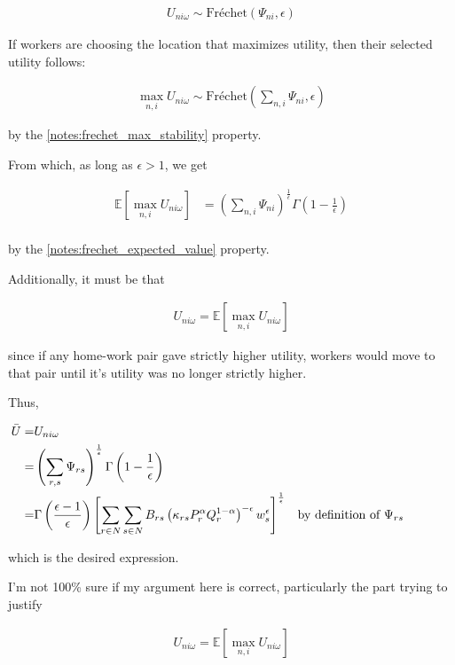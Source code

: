 \documentclass[10pt]{article}
\begin{document}
\begin{align}
    U_{n i \omega} \sim \text{Fréchet}\left(\Psi_{n i}, \epsilon\right)
\end{align}

If workers are choosing the location that maximizes utility, 
then their selected utility follows:

\begin{align}
    \max_{n, i} U_{n i \omega} \sim \text{Fréchet}\left(\sum_{n, i} \Psi_{n i}, \epsilon\right)
\end{align}

by the \autoref{notes:frechet_max_stability} property.

From which, as long as $\epsilon > 1$, we get

\begin{align}
    \mathbb{E}[ \max_{n, i} U_{n i \omega}] &= \left(\sum_{n, i} \Psi_{n i}\right)^{\frac{1}{\epsilon}} \Gamma\left(1-\frac{1}{\epsilon}\right) \\
\end{align}

by the \autoref{notes:frechet_expected_value} property.

Additionally, it must be that

\begin{align}
    U_{n i \omega}= \mathbb{E}[ \max_{n, i} U_{n i \omega}]
\end{align}

since if any home-work pair gave strictly higher 
utility, workers would move to that pair until 
it's utility was no longer strictly higher.

Thus, 

\begin{align}
    \bar{U} =  &U_{n i \omega}  \\ 
    = &\left(\sum_{r, s} \Psi_{r s}\right)^{\frac{1}{\epsilon}} \Gamma\left(1-\frac{1}{\epsilon}\right) \\
    = &\Gamma\left(\frac{\epsilon-1}{\epsilon}\right)\left[\sum_{r \in N} \sum_{s \in N} B_{r s}\left(\kappa_{r s} P_r^\alpha Q_r^{1-\alpha}\right)^{-\epsilon} w_s^\epsilon\right]^{\frac{1}{\epsilon}} && \parbox[t]{4cm}{\raggedright by definition of $\Psi_{rs}$} \\
\end{align}

which is the desired expression.

\begin{questions}
    I'm not 100\% sure if my argument here is correct, particularly 
    the part trying to justify

    \begin{align}
        U_{n i \omega}=\mathbb{E}\left[\max _{n, i} U_{n i \omega}\right]
    \end{align}
\end{questions}
\end{document}
